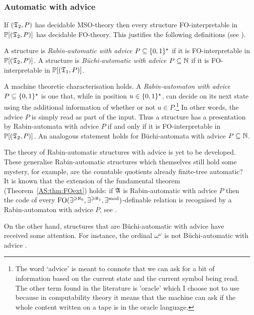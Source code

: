 \subsubsection*{Automatic with advice}

If $(\mathfrak{T}_2,P)$ has decidable MSO-theory then every structure FO-interpretable in ${\mathbb P}[(\mathfrak{T}_2,P)]$ has decidable FO-theory. This justifies
the following definitions (see \cite{CoLo07}).

\begin{definition}
A structure is  {\em Rabin-automatic with advice $P \subseteq \{0,1\}^\star$} if it is FO-interpretable in ${\mathbb P}[(\mathfrak{T}_2,P)]$.
A structure is  {\em B\"uchi-automatic with advice $P \subseteq \mathbb{N}$}  if it is FO-interpretable in ${\mathbb P}[(\mathfrak{T}_1,P)]$.
\end{definition}

A machine theoretic characterisation holds. A {\em Rabin-automaton with
advice $P \subseteq \{0,1\}^\star$} is one that, while in position $u \in \{0,1\}^\star$, can decide on its next
state using the additional information of whether or not $u \in P$.\footnote{The word `advice' is meant to connote that we can ask for a bit of information based on the current state and the current symbol being read. The other term found in the literature is 'oracle' which I choose not to use because in computability theory it means that the machine can ask if the whole content written on a tape is in the oracle language.}  In other words, the advice $P$ is simply read as part
of the input. Thus a structure has a presentation by Rabin-automata with advice $P$ if and only if it is FO-interpretable in ${\mathbb P}[(\mathfrak{T}_2,P)]$. An analogous statement holds for B\"uchi-automata with advice $P \subseteq \mathbb{N}$.


The theory of Rabin-automatic structures with advice is yet to be developed. These generalise Rabin-automatic structures which themselves still hold some mystery, for example, are the countable quotients already finite-tree automatic? It is known that the extension of the fundamental theorem  (Theorem~\ref{AS:thm:FOext}) holds: if $\mathfrak{A}$ is Rabin-automatic with advice $P$ then the code of every $\mbox{\rm FO}(\exists^{\geqslant \aleph_0},\exists^{\geqslant \aleph_1},\exists^{\rm mod})$-definable relation is recognised by a Rabin-automaton with advice $P$, see \cite{BKRa}. 

On the other hand, structures that are B\"uchi-automatic with advice have received some attention. For instance, the ordinal $\omega^\omega$ is not B\"uchi-automatic with advice \cite{RaRu12}.

